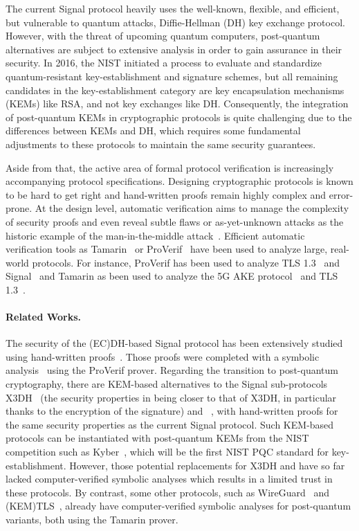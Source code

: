 The current Signal protocol heavily uses the well-known, flexible, and efficient, but vulnerable to quantum attacks, Diffie-Hellman (DH) key exchange protocol. However, with the threat of upcoming quantum computers, post-quantum alternatives are subject to extensive analysis in order to gain assurance in their security. In 2016, the NIST initiated a process to evaluate and standardize quantum-resistant key-establishment and signature schemes, but all remaining candidates in the key-establishment category are key encapsulation mechanisms (KEMs) like RSA, and not key exchanges like DH. Consequently, the integration of post-quantum KEMs in cryptographic protocols is quite challenging due to the differences between KEMs and DH, which requires some fundamental adjustments to these protocols to maintain the same security guarantees.

Aside from that, the active area of formal protocol verification is increasingly accompanying protocol specifications. Designing cryptographic protocols is known to be hard to get right and hand-written proofs remain highly complex and error-prone. At the design level, automatic verification aims to manage the complexity of security proofs and even reveal subtle flaws or as-yet-unknown attacks as the historic example of the man-in-the-middle attack~\cite{Lowe96}. Efficient automatic verification tools as Tamarin~\cite{MeierSCB13} or 
ProVerif~\cite{Blanchet16} have been used to analyze large, real-world 
protocols. For instance, ProVerif has been used to analyze TLS 
1.3~\cite{BhargavanBK17} and Signal~\cite{KobeissiBB17} and Tamarin as been used to analyze the 5G AKE protocol~\cite{BasinDHRSS18} and TLS 1.3~\cite{CremersHHSM17}.

\paragraph{Related Works.} The security of the (EC)DH-based Signal protocol 
has been extensively studied using hand-written 
proofs~\cite{DBLP:journals/joc/Cohn-GordonCDGS20}. Those proofs were completed 
with a symbolic analysis~\cite{KobeissiBB17} using the ProVerif prover. 
Regarding the transition to post-quantum cryptography, there are KEM-based 
alternatives to the Signal sub-protocols 
X3DH~\cite{DBLP:conf/pkc/HashimotoKKP21,DBLP:conf/sacrypt/BrendelFGJS20} 
(the security properties in \cite{DBLP:conf/pkc/HashimotoKKP21} being closer 
to that of X3DH, in particular thanks to the encryption of the signature) and 
\dr~\cite{EC:AlwCorDod19}, with hand-written proofs for the same security 
properties as the current Signal protocol. Such KEM-based protocols can be 
instantiated with post-quantum KEMs from the NIST competition such as 
Kyber~\cite{Kyber}, which will be the first NIST PQC standard for 
key-establishment. However, those potential replacements for X3DH and \dr have 
so far lacked computer-verified symbolic analyses which results in a limited 
trust in these protocols. By contrast, some other protocols, such as 
WireGuard~\cite{SP:HNSWZ21} and 
(KEM)TLS~\cite{DBLP:conf/ccs/SchwabeSW20,ESORICS:CHSW22}, already have 
computer-verified symbolic analyses for post-quantum variants, both using the 
Tamarin prover.

